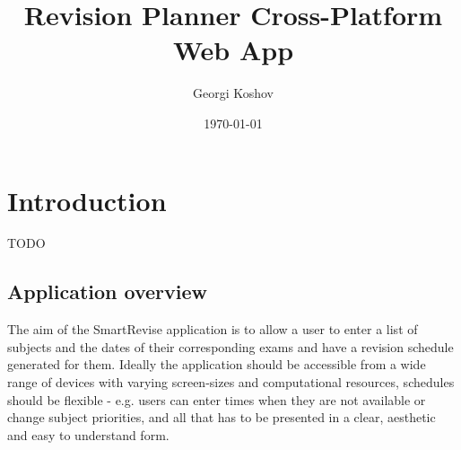 \documentclass[bsc,frontabs,twoside,singlespacing,parskip]{infthesis}     %
\begin{document}
\title{Revision Planner Cross-Platform Web App}

\author{Georgi Koshov}



\date{\today}


\maketitle


\tableofcontents



\chapter{Introduction}

	TODO

	\section{Application overview}
	
		The aim of the SmartRevise application is to allow a user to enter a list of subjects and the dates of their corresponding exams and have a revision schedule generated for them. Ideally the application should be accessible from a wide range of devices with varying screen-sizes and computational resources, schedules should be flexible - e.g. users can enter times when they are not available or change subject priorities, and all that has to be presented in a clear, aesthetic and easy to understand form.
		
\end{document}
